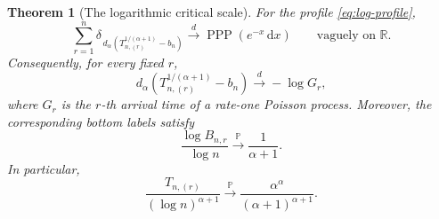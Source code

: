 \documentclass[11pt]{article}
\numberwithin{equation}{section}
\newtheorem{theorem}{Theorem}[section]
\theoremstyle{definition}
\theoremstyle{remark}
\newcommand{\R}{\mathbb R}
\newcommand{\Pp}{\mathbb P}
\newcommand{\PPP}{\operatorname{PPP}}
\newcommand{\dd}{\,\mathrm d}
\begin{document}
\begin{theorem}[The logarithmic critical scale]
\label{thm:log-critical}
For the profile \eqref{eq:log-profile},
\begin{equation}
  \sum_{r=1}^n
  \delta_{\,d_\alpha\left(T_{n,(r)}^{1/(\alpha+1)}-b_n\right)}
  \xrightarrow{d}\PPP(e^{-x}\dd x)
  \qquad\text{vaguely on }\R.
  \label{eq:log-extreme-ppp}
\end{equation}
Consequently, for every fixed $r$,
\begin{equation}
  d_\alpha\left(T_{n,(r)}^{1/(\alpha+1)}-b_n\right)
  \xrightarrow{d}-\log G_r,
  \label{eq:log-order-statistics}
\end{equation}
where $G_r$ is the $r$-th arrival time of a rate-one Poisson process.
Moreover, the corresponding bottom labels satisfy
\begin{equation}
  \frac{\log B_{n,r}}{\log n}
  \xrightarrow{\Pp}\frac1{\alpha+1}.
  \label{eq:log-label-scale}
\end{equation}
In particular,
\begin{equation}
  \frac{T_{n,(r)}}{(\log n)^{\alpha+1}}
  \xrightarrow{\Pp}
  \frac{\alpha^\alpha}{(\alpha+1)^{\alpha+1}}.
  \label{eq:log-clock-scale}
\end{equation}
\end{theorem}
\end{document}
